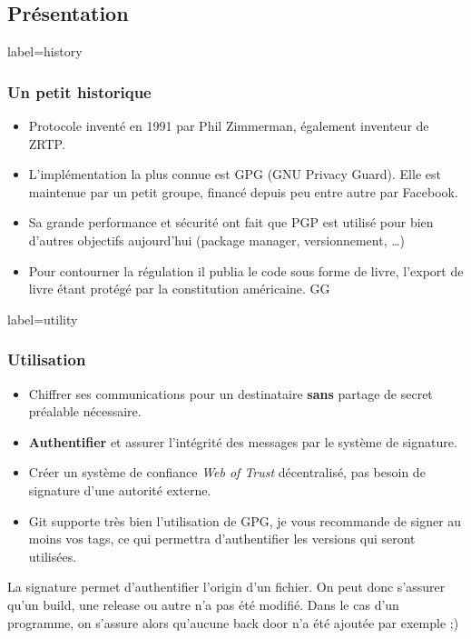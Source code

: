 \documentclass{beamer}
\begin{document}
    \subsection{Présentation}
        \begin{frame}{label=history}
            \frametitle{Un petit historique}
            \begin{center}
                \begin{itemize}
                    \item Protocole inventé en 1991 par Phil Zimmerman, également inventeur de ZRTP.
                    \item L'implémentation la plus connue est GPG (GNU Privacy Guard). Elle est maintenue par un petit groupe, financé depuis peu entre autre par Facebook.
                    \item Sa grande performance et sécurité ont fait que PGP est utilisé pour bien d'autres objectifs aujourd'hui (package manager, versionnement, \ldots)
                    \item Pour contourner la régulation il publia le code sous forme de livre, l'export de livre étant protégé par la constitution américaine. GG
                \end{itemize}
            \end{center}
        \end{frame}
        \begin{frame}{label=utility}
            \frametitle{Utilisation}
            \begin{center}
                \begin{itemize}
                    \item Chiffrer ses communications pour un destinataire \textbf{sans} partage de secret préalable nécessaire.
                    \item \textbf{Authentifier} et assurer l'intégrité des messages par le système de signature.
                    \item Créer un système de confiance \textit{Web of Trust} décentralisé, pas besoin de signature d'une autorité externe.
                    \item Git supporte très bien l'utilisation de GPG, je vous recommande de signer au moins vos tags, ce qui permettra d'authentifier les versions qui seront utilisées.
                \end{itemize}
                \begin{tcolorbox}[colback=green!5,colframe=green!40!black,title=Pourquoi authentifier ?]
                    La signature permet d'authentifier l'origin d'un fichier. On peut donc s'assurer qu'un build, une release ou autre n'a pas été modifié.
                    Dans le cas d'un programme, on s'assure alors qu'aucune back door n'a été ajoutée par exemple ;)
                \end{tcolorbox}
            \end{center}
        \end{frame}
\end{document}
